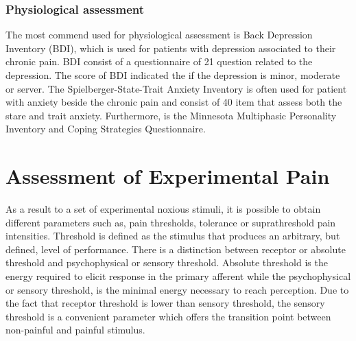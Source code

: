 \subsubsection{Physiological assessment}
The most commend used for physiological assessment is Back Depression Inventory (BDI), which is used for patients with depression associated to their chronic pain. BDI consist of a questionnaire of 21 question related to the depression. The score of BDI indicated the if the depression is minor, moderate or server. The Spielberger-State-Trait Anxiety Inventory is often used for patient with anxiety beside the chronic pain and consist of 40 item that assess both the stare and trait anxiety.  Furthermore, is the Minnesota Multiphasic Personality Inventory and Coping Strategies Questionnaire. 



\section{Assessment of Experimental Pain}
As a result to a set of experimental noxious stimuli, it is possible to obtain different parameters such as, pain thresholds, tolerance or suprathreshold pain intensities. Threshold is defined as the stimulus that produces an arbitrary, but defined, level of performance. There is a distinction between receptor or absolute threshold and psychophysical or sensory threshold. Absolute threshold is the energy required to elicit response in the primary afferent while the psychophysical or sensory threshold, is the minimal energy necessary to reach perception. Due to the fact that receptor threshold is lower than sensory threshold, the sensory threshold is a convenient parameter which offers the transition point between non-painful and painful stimulus. \cite{Yarnitsky2006}


